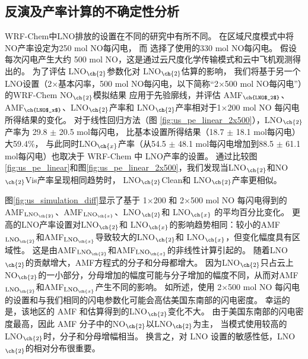 
\subsection{反演及产率计算的不确定性分析}


WRF-Chem中LNO排放的设置在不同的研究中有所不同。
\citet{Zhao.2009}在区域尺度模式中将NO产率设定为250 mol NO每闪电，
而 \citet{Bela.2016}选择了\citet{Barth.2012}使用的330 mol NO每闪电。
\citet{Wang.2015a}假设每次闪电产生大约 500 mol NO，这是通过云尺度化学传输模式和云中飞机观测得出的\citep{Ott.2010}。
为了评估 LNO$_{\ch{2}}$参数化对 LNO$_{\ch{2}}$估算的影响，
我们将基于另一个LNO设置（2$\times$基本闪率，500 mol NO每闪电，以下简称“2$\times$500 mol NO每闪电”）的WRF-Chem NO$_{\ch{2}}$模拟结果
应用于先验廓线，并评估 AMF$_{\ch{LNO$_2$}}$、AMF$_{\ch{LNO$_x$}}$、LNO$_{\ch{2}}$产率和 LNO$_{\ch{2}}$产率相对于1$\times$200 mol NO 每闪电所得结果的变化。
对于线性回归方法（图 \ref{fig:us_pe_linear_2x500}），LNO$_{\ch{2}}$产率为 29.8 $\pm$ 20.5 mol每闪电，
比基本设置所得结果（18.7 $\pm$ 18.1 mol每闪电）大59.4\%，
与此同时LNO$_{\ch{x}}$产率（从54.5 $\pm$ 48.1 mol每闪电增加到88.5 $\pm$ 61.1 mol每闪电）也取决于 WRF-Chem 中 LNO产率的设置。
通过比较图\ref{fig:us_pe_linear}和图\ref{fig:us_pe_linear_2x500}，我们发现当LNO$_{\ch{2}}$和NO$_{\ch{2}}$Vis产率呈现相同趋势时，
LNO$_{\ch{2}}$Clean和 LNO$_{\ch{2}}$产率更相似。


图\ref{fig:us_simulation_diff}显示了基于 1$\times$200 和 2$\times$500 mol NO 每闪电得到的AMF$_\textrm{LNO$_{\ch{2}}$}$、AMF$_\textrm{LNO$_{\ch{x}}$}$、LNO$_{\ch{2}}$和 LNO$_{\ch{x}}$ 的平均百分比变化。
更高的LNO产率设置对LNO$_{\ch{2}}$和 LNO$_{\ch{x}}$的影响趋势相同：较小的AMF$_\textrm{LNO$_{\ch{2}}$}$和AMF$_\textrm{LNO$_{\ch{x}}$}$导致较大的LNO$_{\ch{2}}$和 LNO$_{\ch{x}}$，但变化幅度具有区域性。
这是由AMF$_\textrm{LNO$_{\ch{2}}$}$和AMF$_\textrm{LNO$_{\ch{x}}$}$的非线性计算引起的。
随着LNO$_{\ch{2}}$的贡献增大，AMF方程式的分子和分母都增大。
因为LNO$_{\ch{2}}$只占云上NO$_{\ch{2}}$的一小部分，分母增加的幅度可能与分子增加的幅度不同，从而对AMF$_\textrm{LNO$_{\ch{2}}$}$和AMF$_\textrm{LNO$_{\ch{x}}$}$产生不同的影响。
如\citet{Zhu.2019}所述，使用 2$\times$500 mol NO 每闪电的设置和与我们相同的闪电参数化可能会高估美国东南部的闪电密度。
幸运的是，该地区的 AMF 和估算得到的LNO$_{\ch{2}}$变化不大。
由于美国东南部的闪电密度最高，因此 AMF 分子中的NO$_{\ch{2}}$以LNO$_{\ch{2}}$为主，
当模式使用较高的LNO$_{\ch{2}}$时，分子和分母增幅相当。
换言之，对 LNO 设置的敏感性低，LNO$_{\ch{2}}$的相对分布很重要。



